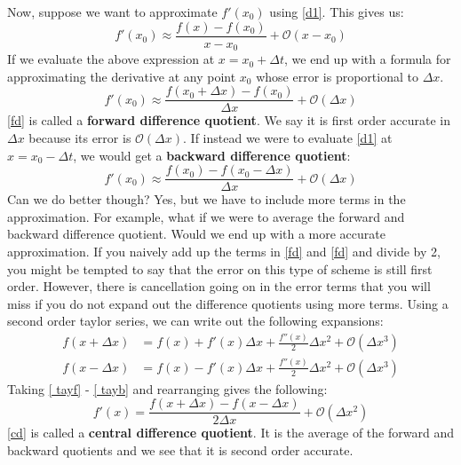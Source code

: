 \documentclass[]{article}
\theoremstyle{definition}
\numberwithin{equation}{section}
\begin{document}
	Now, suppose we want to approximate $f'(x_0)$ using \eqref{d1}. This gives us:
	\begin{equation}
	f'(x_0) \approx \frac{f(x) - f(x_0)}{x-x_0} + \mathcal{O}(x-x_0)
	\end{equation}
	If we evaluate the above expression at $ x = x_0 + \Delta t$, we end up with a formula for approximating the derivative at any point $x_0$ whose error is proportional to $\Delta x$.
	\begin{equation}
	f'(x_0) \approx \frac{f(x_0+\Delta x) - f(x_0)}{\Delta x} + \mathcal{O}(\Delta x) \label{fd}
	\end{equation}
	\eqref{fd} is called a \textbf{forward difference quotient}. We say it is first order accurate in $\Delta x$ because its error is $\mathcal{O}(\Delta x)$. If instead we were to evaluate \eqref{d1} at $x = x_0 - \Delta t$, we would get a \textbf{backward difference quotient}:
	\begin{equation}
	f'(x_0) \approx \frac{f(x_0) - f(x_0-\Delta x)}{\Delta x} + \mathcal{O} (\Delta x) \label{bd}
	\end{equation}
	Can we do better though? Yes, but we have to include more terms in the approximation. For example, what if we were to average the forward and backward difference quotient. Would we end up with a more accurate approximation. If you naively add up the terms in \eqref{fd} and \eqref{fd} and divide by 2, you might be tempted to say that the error on this type of scheme is still first order. However, there is cancellation going on in the error terms that you will miss if you do not expand out the difference quotients using more terms. Using a second order taylor series, we can write out the following expansions:
	\begin{align}
	f(x+\Delta x) &= f(x) + f'(x) \Delta x + \frac{f''(x)}{2} \Delta x^2 + \mathcal{O}(\Delta x^3) \label{ tayf} \\
	f(x-\Delta x) &= f(x) - f'(x) \Delta x + \frac{f''(x)}{2} \Delta x^2 + \mathcal{O}(\Delta x^3) \label{ tayb} 
	\end{align}
	Taking \eqref{ tayf} - \eqref{ tayb} and rearranging gives the following:
	\begin{equation}
	f'(x) = \frac{f(x+\Delta x) - f(x-\Delta x)}{2\Delta x} + \mathcal{O}(\Delta x^2) \label{cd}
	\end{equation}
	\eqref{cd} is called a \textbf{central difference quotient}. It is the average of the forward and backward quotients and we see that it is second order accurate.
	
\end{document}
